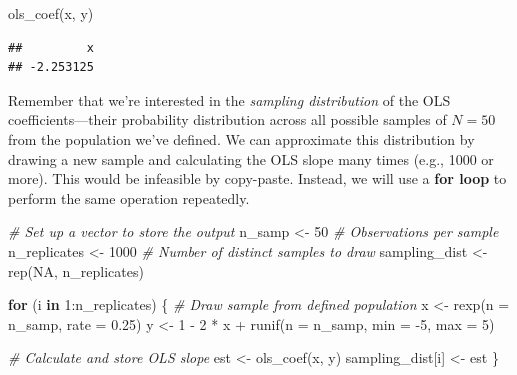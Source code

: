 \documentclass[
  12pt,
  oneside,openany]{book}
\newenvironment{Shaded}{\begin{snugshade}}{\end{snugshade}}
\newcommand{\AttributeTok}[1]{\textcolor[rgb]{0.77,0.63,0.00}{#1}}
\newcommand{\CommentTok}[1]{\textcolor[rgb]{0.56,0.35,0.01}{\textit{#1}}}
\newcommand{\ConstantTok}[1]{\textcolor[rgb]{0.00,0.00,0.00}{#1}}
\newcommand{\ControlFlowTok}[1]{\textcolor[rgb]{0.13,0.29,0.53}{\textbf{#1}}}
\newcommand{\DecValTok}[1]{\textcolor[rgb]{0.00,0.00,0.81}{#1}}
\newcommand{\FloatTok}[1]{\textcolor[rgb]{0.00,0.00,0.81}{#1}}
\newcommand{\FunctionTok}[1]{\textcolor[rgb]{0.00,0.00,0.00}{#1}}
\newcommand{\NormalTok}[1]{#1}
\newcommand{\OtherTok}[1]{\textcolor[rgb]{0.56,0.35,0.01}{#1}}
\newcommand{\SpecialCharTok}[1]{\textcolor[rgb]{0.00,0.00,0.00}{#1}}
\begin{document}
\begin{Shaded}
\begin{Highlighting}[]
\FunctionTok{ols\_coef}\NormalTok{(x, y)}
\end{Highlighting}
\end{Shaded}

\begin{verbatim}
##         x 
## -2.253125
\end{verbatim}

Remember that we're interested in the \emph{sampling distribution} of the OLS coefficients---their probability distribution across all possible samples of \(N = 50\) from the population we've defined.
We can approximate this distribution by drawing a new sample and calculating the OLS slope many times (e.g., 1000 or more).
This would be infeasible by copy-paste.
Instead, we will use a \textbf{for loop} to perform the same operation repeatedly.

\begin{Shaded}
\begin{Highlighting}[]
\CommentTok{\# Set up a vector to store the output}
\NormalTok{n\_samp }\OtherTok{\textless{}{-}} \DecValTok{50}  \CommentTok{\# Observations per sample}
\NormalTok{n\_replicates }\OtherTok{\textless{}{-}} \DecValTok{1000}  \CommentTok{\# Number of distinct samples to draw}
\NormalTok{sampling\_dist }\OtherTok{\textless{}{-}} \FunctionTok{rep}\NormalTok{(}\ConstantTok{NA}\NormalTok{, n\_replicates)}

\ControlFlowTok{for}\NormalTok{ (i }\ControlFlowTok{in} \DecValTok{1}\SpecialCharTok{:}\NormalTok{n\_replicates) \{}
  \CommentTok{\# Draw sample from defined population}
\NormalTok{  x }\OtherTok{\textless{}{-}} \FunctionTok{rexp}\NormalTok{(}\AttributeTok{n =}\NormalTok{ n\_samp, }\AttributeTok{rate =} \FloatTok{0.25}\NormalTok{)}
\NormalTok{  y }\OtherTok{\textless{}{-}} \DecValTok{1} \SpecialCharTok{{-}} \DecValTok{2} \SpecialCharTok{*}\NormalTok{ x }\SpecialCharTok{+} \FunctionTok{runif}\NormalTok{(}\AttributeTok{n =}\NormalTok{ n\_samp, }\AttributeTok{min =} \SpecialCharTok{{-}}\DecValTok{5}\NormalTok{, }\AttributeTok{max =} \DecValTok{5}\NormalTok{)}

  \CommentTok{\# Calculate and store OLS slope}
\NormalTok{  est }\OtherTok{\textless{}{-}} \FunctionTok{ols\_coef}\NormalTok{(x, y)}
\NormalTok{  sampling\_dist[i] }\OtherTok{\textless{}{-}}\NormalTok{ est}
\NormalTok{\}}
\end{Highlighting}
\end{Shaded}
\end{document}
